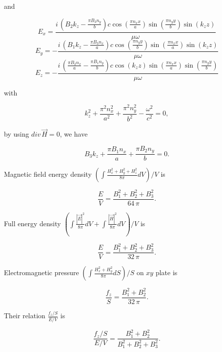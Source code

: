 \documentclass[twoside, 10pt]{article}
\begin{document}
\begin{multicols}{2}
    and

\[E_{x} = \frac{i \, {\left(B_{2} k_{z} - \frac{\pi B_{3} n_{y}}{b}\right)} c \cos\left(\frac{\pi n_{x} x}{a}\right) \sin\left(\frac{\pi n_{y} y}{b}\right) \sin\left(k_{z} z\right)}{\mu \omega}\]
\[E_{y} = -\frac{i \, {\left(B_{1} k_{z} - \frac{\pi B_{3} n_{x}}{a}\right)} c \cos\left(\frac{\pi n_{y} y}{b}\right) \sin\left(\frac{\pi n_{x} x}{a}\right) \sin\left(k_{z} z\right)}{\mu \omega}\]
\[E_{z} = -\frac{i \, {\left(\frac{\pi B_{2} n_{x}}{a} - \frac{\pi B_{1} n_{y}}{b}\right)} c \cos\left(k_{z} z\right) \sin\left(\frac{\pi n_{x} x}{a}\right) \sin\left(\frac{\pi n_{y} y}{b}\right)}{\mu \omega}\]

    with

\begin{equation}k_{z}^{2} + \frac{\pi^{2} n_{x}^{2}}{a^{2}} + \frac{\pi^{2} n_{y}^{2}}{b^{2}} - \frac{\omega^{2}}{c^{2}} = 0,\end{equation}

    by using \(div\,\vec{H} = 0\), we have

\begin{equation}B_{3} k_{z} + \frac{\pi B_{1} n_{x}}{a} + \frac{\pi B_{2} n_{y}}{b} = 0.\end{equation}

    Magnetic field energy density
\(\left(\int \frac{H_x^2+H_y^2+H_z^2}{8 \pi}dV\right)\big/{V}\) is

\begin{equation}\frac{E}{V} = \frac{{B_{1}^{2} + B_{2}^{2} + B_{3}^{2}}}{64 \, \pi}.\end{equation}

    Full energy density
\(\left(\int \frac{|\vec{E}|^2}{8 \pi}dV + \int \frac{|\vec{H}|^2}{8 \pi}dV\right)\big/{V}\)
is

\begin{equation}\frac{E}{V} = \frac{{B_{1}^{2} + B_{2}^{2} + B_{3}^{2}}}{32 \, \pi}.\end{equation}

    Electromagnetic pressure
\(\left({\int \frac {H_x^2+H_y^2}{8 \pi} dS}\right)\big/{S}\) on \(xy\)
plate is

\begin{equation}\frac{f_z}{S}=\frac{{B_{1}^{2} + B_{2}^{2}}}{32 \, \pi}.\end{equation}

Their relation \(\frac{f_z/S}{E/V}\) is

\begin{equation}\frac{f_z/S}{E/V} = \frac{{B_{1}^{2} + B_{2}^{2}}}{B_{1}^{2} + B_{2}^{2} + B_{3}^{2}}.\end{equation}


\end{multicols}
\end{document}
